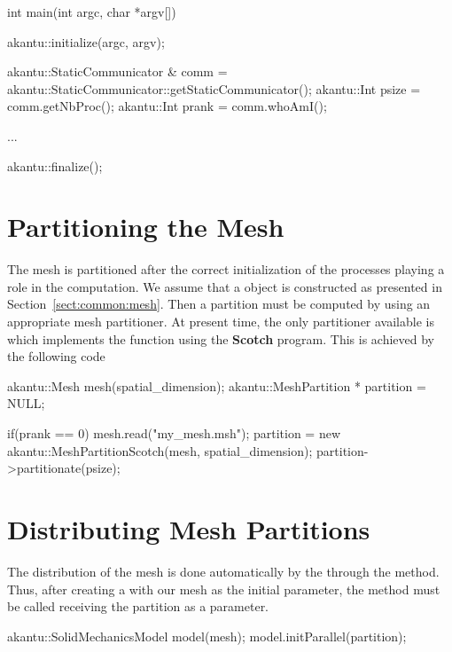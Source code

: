 \begin{cpp}
int main(int argc, char *argv[])
{
  akantu::initialize(argc, argv);

  akantu::StaticCommunicator & comm =
  akantu::StaticCommunicator::getStaticCommunicator();
  akantu::Int psize = comm.getNbProc();
  akantu::Int prank = comm.whoAmI();

  ...

  akantu::finalize();
}
\end{cpp}

\section{Partitioning the Mesh}

The mesh is partitioned after the correct initialization of the
processes playing a role in the computation. We assume that a
 object is constructed as presented in
Section~\ref{sect:common:mesh}.  Then a partition must be computed by
using an appropriate mesh partitioner. At present time, the only
partitioner available is  which implements
the function  using the
\textbf{Scotch}\cite{scotch} program.  This is achieved by the
following code

\begin{cpp}
  akantu::Mesh mesh(spatial_dimension);
  akantu::MeshPartition * partition = NULL;

  if(prank == 0) {
    mesh.read("my_mesh.msh");
    partition = new akantu::MeshPartitionScotch(mesh, spatial_dimension);
    partition->partitionate(psize);
  }
\end{cpp}


\section{Distributing Mesh Partitions}

The distribution of the mesh is done automatically by the
 through the  method.  Thus,
after creating a  with our mesh as the initial
parameter, the  method must be called receiving the partition
as a parameter.

\begin{cpp}
  akantu::SolidMechanicsModel model(mesh);
  model.initParallel(partition);
\end{cpp}

